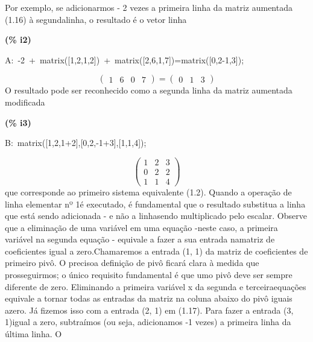 \documentclass[fleqn]{article}
\begin{document}
Por exemplo, se adicionarmos - 2 vezes a primeira linha da matriz aumentada (1.16) à segundalinha, o resultado é o vetor linha


\noindent
\begin{minipage}[t]{4.000000em}\color{red}\bfseries
(\% i2)	
\end{minipage}
\begin{minipage}[t]{\textwidth}\color{blue}
A:\ -2\ +\ matrix([1,2,1,2])\ +\ matrix([2,6,1,7])=matrix([0,2-1,3]);
\end{minipage}
\[\displaystyle \tag{A} 
\begin{pmatrix}1 & 6 & 0 & 7\end{pmatrix}\mathop{=}\begin{pmatrix}0 & 1 & 3\end{pmatrix}\mbox{}
\]
O resultado pode ser reconhecido como a segunda linha da matriz aumentada modificada


\noindent
\begin{minipage}[t]{4.000000em}\color{red}\bfseries
(\% i3)	
\end{minipage}
\begin{minipage}[t]{\textwidth}\color{blue}
B:\ matrix([1,2,1+2],[0,2,-1+3],[1,1,4]);
\end{minipage}
\[\displaystyle \tag{B} 
\begin{pmatrix}1 & 2 & 3\\
0 & 2 & 2\\
1 & 1 & 4\end{pmatrix}\mbox{}
\]
que corresponde ao primeiro sistema equivalente (1.2). Quando a operação de linha elementar nº 1é executado, é fundamental que o resultado substitua a linha que está sendo adicionada - e não a linhasendo multiplicado pelo escalar. Observe que a eliminação de uma variável em uma equação -neste caso, a primeira variável na segunda equação - equivale a fazer a sua entrada namatriz de coeficientes igual a zero.Chamaremos a entrada (1, 1) da matriz de coeficientes de primeiro pivô. O precisoa definição de pivô ficará clara à medida que prosseguirmos; o único requisito fundamental é que umo pivô deve ser sempre diferente de zero. Eliminando a primeira variável x da segunda e terceiraequações equivale a tornar todas as entradas da matriz na coluna abaixo do pivô iguais azero. Já fizemos isso com a entrada (2, 1) em (1.17). Para fazer a entrada (3, 1)igual a zero, subtraímos (ou seja, adicionamos -1 vezes) a primeira linha da última linha. O
\end{document}
